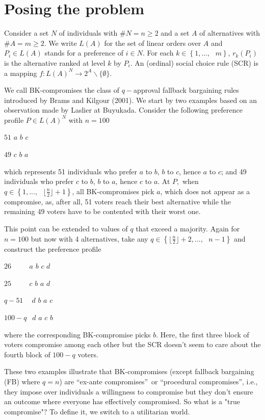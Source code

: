 \documentclass[12pt,notitlepage,a4paper]{article}
\begin{document}
\section{Posing the problem}

Consider a set $N$ of individuals with $\#N=n\geq 2$ and a set $A$ of
alternatives with $\#A=m\geq 2$. We write $L(A)$ for the set of linear
orders over $A$ and $P_{i}\in L(A)$ stands for a preference of $i\in N$. For
each $k\in \left\{ 1,...,\text{ }m\right\} $, $r_{k}(P_{i})$ is the
alternative ranked at level $k$ by $P_{i}$. An (ordinal) social choice rule
(SCR) is a mapping $f:L(A)^{N}\rightarrow 2^{A}\backslash \{\emptyset \}$.

We call BK-compromises the class of $q-$approval fallback bargaining rules
introduced by Brams and Kilgour (2001). We start by two examples based on an
observation made by Laslier at Buyukada. Consider the following preference
profile $P\in L(A)^{N}$ with $n=100$

$51$ $a$ $b$ $c$

$49$ $c$ $b$ $a$

which represents 51 individuals who prefer $a$ to $b$, $b$ to $c$, hence $a$
to $c$; and 49 individuals who prefer $c$ to $b$, $b$ to $a$, hence $c$ to $a
$. At $P,$ when $q\in \left\{ 1,...,\text{ }\lfloor \frac{n}{2}\rfloor
+1\right\} $, all BK-compromises pick $a$, which does not appear as a
compromise, as, after all, 51 voters reach their best alternative while the
remaining 49 voters have to be contented with their worst one.

This point can be extended to values of $q$ that exceed a majority. Again
for $n=100$ but now with 4 alternatives, take any $q\in \left\{ \lfloor 
\frac{n}{2}\rfloor +2,...,\text{ }n-1\right\} $ and construct the preference
profile

$26$ $\ \ \ \ \ \ \ \ \ \ a$ $b$ $c$ $d$

$25$ $\ \ \ \ \ \ \ \ \ \ c$ $b$ $a$ $d$

$q-51$ $\ \ \ \ d$ $b$ $a$ $c$

$100-q$ $\ \ d$ $a$ $c$ $b$

\bigskip where the corresponding BK-compromise picks $b$. Here, the first
three block of voters compromise among each other but the SCR doesn't seem
to care about the fourth block of $100-q$ voters.

These two examples illustrate that BK-compromises (except fallback
bargaining (FB) where $q=n$) are \textquotedblleft ex-ante
compromises\textquotedblright\ or \textquotedblleft procedural
compromises\textquotedblright , i.e., they impose over individuals a
willingness to compromise but they don't ensure an outcome where everyone
has effectively compromised. So what is a "true compromise"? To define it,
we switch to a utilitarian world.
\end{document}
